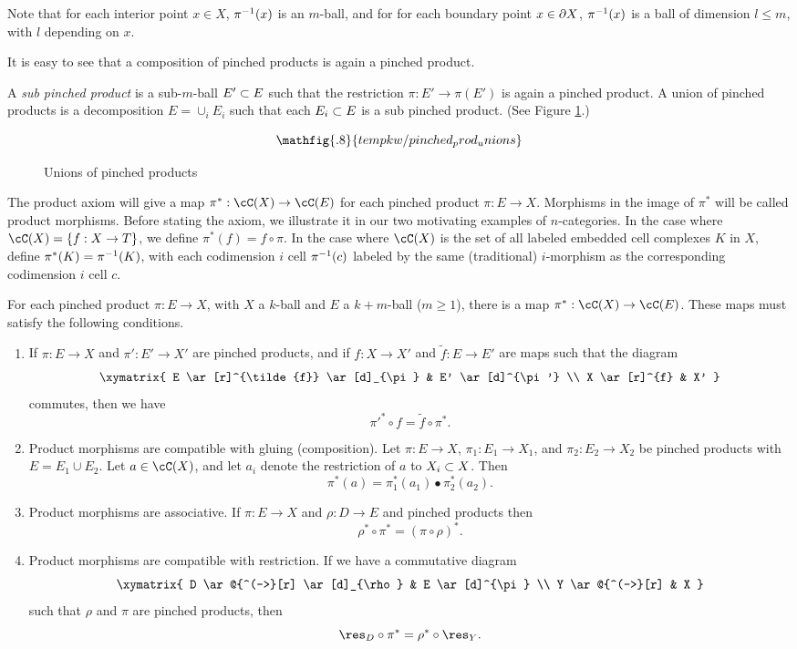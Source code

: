 Note that for each interior point $x\in X$, $\pi^{-1}(x)$ is an $m$-ball,
and for for each boundary point $x\in\partial X$, $\pi^{-1}(x)$ is a ball of dimension
$l \le m$, with $l$ depending on $x$.

It is easy to see that a composition of pinched products is again a pinched product.

A {\it sub pinched product} is a sub-$m$-ball $E'\subset E$ such that the restriction
$\pi:E'\to \pi(E')$ is again a pinched product.
A {union} of pinched products is a decomposition $E = \cup_i E_i$
such that each $E_i\subset E$ is a sub pinched product.
(See Figure \ref{pinched_prod_unions}.)
\begin{figure}[t]
$$\mathfig{.8}{tempkw/pinched_prod_unions}$$
\caption{Unions of pinched products}\label{pinched_prod_unions}
\end{figure}

The product axiom will give a map $\pi^*:\cC(X)\to \cC(E)$ for each pinched product
$\pi:E\to X$.
Morphisms in the image of $\pi^*$ will be called product morphisms.
Before stating the axiom, we illustrate it in our two motivating examples of $n$-categories.
In the case where $\cC(X) = \{f: X\to T\}$, we define $\pi^*(f) = f\circ\pi$.
In the case where $\cC(X)$ is the set of all labeled embedded cell complexes $K$ in $X$, 
define $\pi^*(K) = \pi^{-1}(K)$, with each codimension $i$ cell $\pi^{-1}(c)$ labeled by the
same (traditional) $i$-morphism as the corresponding codimension $i$ cell $c$.


\addtocounter{axiom}{-1}
\begin{axiom}
For each pinched product $\pi:E\to X$, with $X$ a $k$-ball and $E$ a $k{+}m$-ball ($m\ge 1$),
there is a map $\pi^*:\cC(X)\to \cC(E)$.
These maps must satisfy the following conditions.
\begin{enumerate}
\item
If $\pi:E\to X$ and $\pi':E'\to X'$ are pinched products, and
if $f:X\to X'$ and $\tilde{f}:E \to E'$ are maps such that the diagram
\[ \xymatrix{
	E \ar[r]^{\tilde{f}} \ar[d]_{\pi} & E' \ar[d]^{\pi'} \\
	X \ar[r]^{f} & X'
} \]
commutes, then we have 
\[
	\pi'^*\circ f = \tilde{f}\circ \pi^*.
\]
\item
Product morphisms are compatible with gluing (composition).
Let $\pi:E\to X$, $\pi_1:E_1\to X_1$, and $\pi_2:E_2\to X_2$ 
be pinched products with $E = E_1\cup E_2$.
Let $a\in \cC(X)$, and let $a_i$ denote the restriction of $a$ to $X_i\subset X$.
Then 
\[
	\pi^*(a) = \pi_1^*(a_1)\bullet \pi_2^*(a_2) .
\]
\item
Product morphisms are associative.
If $\pi:E\to X$ and $\rho:D\to E$ and pinched products then
\[
	\rho^*\circ\pi^* = (\pi\circ\rho)^* .
\]
\item
Product morphisms are compatible with restriction.
If we have a commutative diagram
\[ \xymatrix{
	D \ar@{^(->}[r] \ar[d]_{\rho} & E \ar[d]^{\pi} \\
	Y \ar@{^(->}[r] & X
} \]
such that $\rho$ and $\pi$ are pinched products, then
\[
	\res_D\circ\pi^* = \rho^*\circ\res_Y .
\]
\end{enumerate}
\end{axiom}


